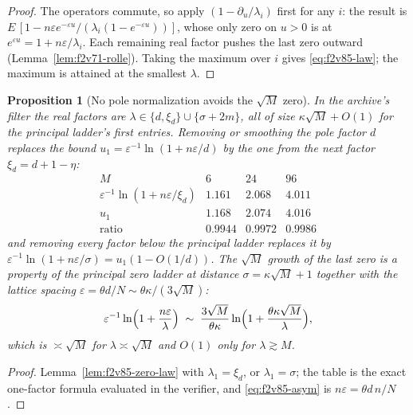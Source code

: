 \documentclass[11pt]{article}
\newtheorem{proposition}[theorem]{Proposition}
\theoremstyle{definition}
\theoremstyle{remark}
\begin{document}
\begin{proof}
The operators commute, so apply \((1-\partial_u/\lambda_i)\) first for
any \(i\): the result is \(E\,[1-n\varepsilon e^{-\varepsilon u}/(\lambda_i(1-e^{-\varepsilon u}))]\),
whose only zero on \(u>0\) is at \(e^{\varepsilon u}=1+n\varepsilon/\lambda_i\).
Each remaining real factor pushes the last zero outward
(Lemma~\ref{lem:f2v71-rolle}).  Taking the maximum over \(i\) gives
\eqref{eq:f2v85-law}; the maximum is attained at the smallest \(\lambda\).
\end{proof}

\begin{proposition}[No pole normalization avoids the \(\sqrt M\) zero]
\label{prop:f2v85-smoothed}
In the archive's filter the real factors are \(\lambda\in\{d,\xi_d\}\cup\{\sigma+2m\}\),
all of size \(\kappa\sqrt M+O(1)\) for the principal ladder's first
entries.  Removing or smoothing the pole factor \(d\) replaces the bound
\(u_1=\varepsilon^{-1}\ln(1+n\varepsilon/d)\) by the one from the next
factor \(\xi_d=d+1-\eta\):
\begin{equation}
\begin{array}{c|ccc}
 M & 6 & 24 & 96\\ \hline
 \varepsilon^{-1}\ln(1+n\varepsilon/\xi_d) & 1.161 & 2.068 & 4.011\\
 u_1 & 1.168 & 2.074 & 4.016\\
 \text{ratio} & 0.9944 & 0.9972 & 0.9986
\end{array}
\label{eq:f2v85-xi}
\end{equation}
and removing every factor below the principal ladder replaces it by
\(\varepsilon^{-1}\ln(1+n\varepsilon/\sigma)=u_1(1-O(1/d))\).  The
\(\sqrt M\) growth of the last zero is a property of the principal
zero ladder at distance \(\sigma=\kappa\sqrt M+1\) together with the
lattice spacing \(\varepsilon=\theta d/N\sim\theta\kappa/(3\sqrt M)\):
\begin{equation}
 \varepsilon^{-1}\ln\Bigl(1+\frac{n\varepsilon}{\lambda}\Bigr)
 \;\sim\;\frac{3\sqrt M}{\theta\kappa}\ln\Bigl(1+\frac{\theta\kappa\sqrt M}{\lambda}\Bigr),
\label{eq:f2v85-asym}
\end{equation}
which is \(\asymp\sqrt M\) for \(\lambda\asymp\sqrt M\) and \(O(1)\) only
for \(\lambda\gtrsim M\).
\end{proposition}

\begin{proof}
Lemma~\ref{lem:f2v85-zero-law} with \(\lambda_1=\xi_d\), or
\(\lambda_1=\sigma\); the table is the exact one-factor formula
evaluated in the verifier, and \eqref{eq:f2v85-asym} is
\(n\varepsilon=\theta d\,n/N\).
\end{proof}
\end{document}
